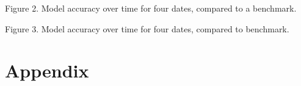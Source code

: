 \documentclass[a4paper,11pth]{article}
\begin{document}
Figure 2. Model accuracy over time for four dates, compared to a benchmark.

Figure 3. Model accuracy over time for four dates, compared to benchmark.


\newpage

%
\newpage
%
\newpage

%


\newpage
\appendix
\section{Appendix}
%
\end{document}
